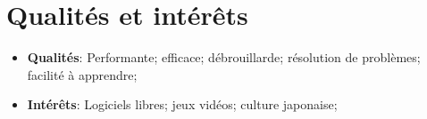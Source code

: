 \documentclass[letterpaper,11pt]{article}
\newcommand{\resumeItem}[2]{
  \item\small{
    \textbf{#1}{: #2 \vspace{-2pt}}
  }
}
\newcommand{\resumeSubItem}[2]{\resumeItem{#1}{#2}\vspace{-4pt}}
\newcommand{\resumeSubHeadingListStart}{\begin{itemize}[leftmargin=*]}
\newcommand{\resumeSubHeadingListEnd}{\end{itemize}}
\begin{document}
\section{Qualités et intérêts}
  \resumeSubHeadingListStart
    \resumeSubItem{Qualités}
      {Performante; efficace; débrouillarde; résolution de problèmes; facilité à apprendre;}
    \resumeSubItem{Intérêts}
      {Logiciels libres; jeux vidéos; culture japonaise;}
 \resumeSubHeadingListEnd

\end{document}
